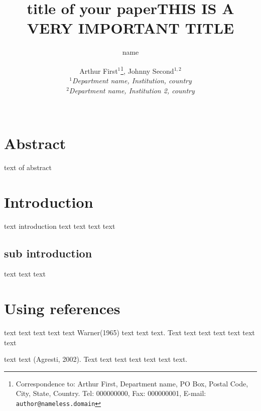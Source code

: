 \documentclass[10pt, fullpage, a4paper, titlepage]{article}
\title{title of your paper}
\author{name}
\begin{document}
\title{THIS IS A VERY IMPORTANT TITLE}

\author{Arthur First$^{1}$\thanks{Correspondence to: Arthur First, Department name, PO Box, Postal Code, City, State, Country. Tel: 000000000, Fax: 000000001, E-mail: \texttt{author@nameless.domain}}, Johnny Second$^{1,2}$\\
\small{\textsl{$^1$Department name, Institution, country}}\\
\small{\textsl{$^2$Department name, Institution 2, country}}\\
\newline\\
\date{}}
\maketitle
\thispagestyle{empty}

\section*{Abstract}
text of abstract

\section{Introduction}
text introduction text text text text

\subsection{sub introduction}
text text text


\section{Using references}
text text text text text Warner(1965)\nocite{WarnerSL1965} text text text. Text text text text text text text 

text text (Agresti, 2002)\nocite{AgrestiA2002}. Text text text text text text text.

\newpage


\end{document}
